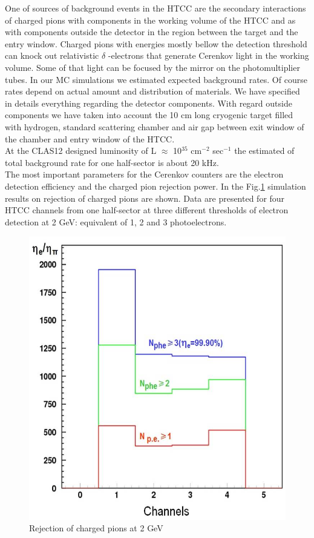\indent One of sources of background events in the HTCC are the secondary interactions of charged pions with components in the working volume of the HTCC and as with components outside the detector in the region between the target and the entry window. Charged pions with energies mostly bellow the detection threshold can knock out relativistic $\delta$ -electrons that generate Cerenkov light in the working volume. Some of that light can be focused by the mirror on the photomultiplier tubes. In our MC simulations we estimated expected background rates. Of course rates depend on actual amount and distribution of materials. We have specified in details  everything regarding the detector components. With regard outside components we have taken into account the 10 cm long cryogenic target filled with hydrogen, standard scattering chamber and air gap between exit window of the chamber and entry window of the HTCC. \\
\indent At the CLAS12 designed luminosity of L $\approx$ 10$^{35}$ cm$^{-2}$ sec$^{-1}$ the estimated of total background rate for one half-sector is about 20 kHz. \\  
\indent The most important parameters for the Cerenkov counters are the electron detection efficiency and the charged pion rejection power. In the Fig.\ref{fig:Pion_rejection_2GeV} simulation results on rejection of charged pions are shown. Data are presented for four HTCC channels from one half-sector at three different thresholds of electron detection at 2 GeV: equivalent of 1, 2 and 3 photoelectrons. 

\begin{figure}[!h]
    \centering
    \includegraphics[width=1.0\linewidth,trim={0.0cm 0.0cm 0.0cm 0.0cm},clip]{images/Pion_rejection_2GeV.jpg}
    \caption{Rejection of charged pions at 2 GeV}
    \label{fig:Pion_rejection_2GeV}
\end{figure}

